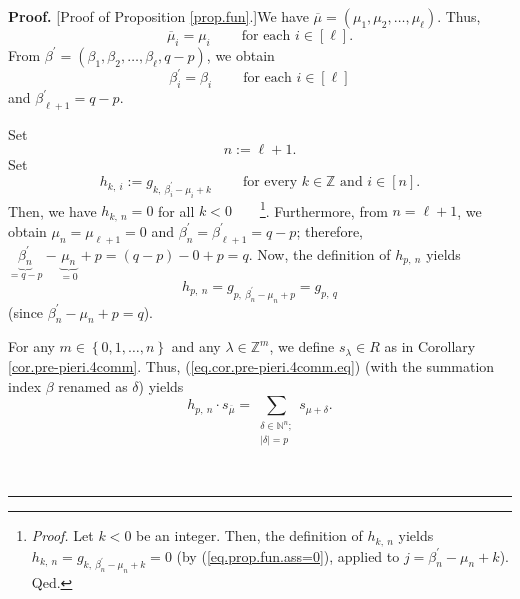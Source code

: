 \documentclass[numbers=enddot,12pt,final,onecolumn,notitlepage,english]{scrartcl}%
\theoremstyle{definition}
\newenvironment{proof}[1][Proof]{\noindent\textbf{#1.} }{\ \rule{0.5em}{0.5em}}
\let\sumnonlimits\sum
\renewcommand{\sum}{\sumnonlimits\limits}
\newenvironment{verlong}{}{}
\begin{document}
\begin{verlong}
\begin{proof}
[Proof of Proposition \ref{prop.fun}.]We have $\overline{\mu}=\left(  \mu
_{1},\mu_{2},\ldots,\mu_{\ell}\right)  $. Thus,%
\begin{equation}
\overline{\mu}_{i}=\mu_{i}\ \ \ \ \ \ \ \ \ \ \text{for each }i\in\left[
\ell\right]  . \label{pf.prop.fun.mubari}%
\end{equation}
From $\beta^{\prime}=\left(  \beta_{1},\beta_{2},\ldots,\beta_{\ell
},q-p\right)  $, we obtain%
\begin{equation}
\beta_{i}^{\prime}=\beta_{i}\ \ \ \ \ \ \ \ \ \ \text{for each }i\in\left[
\ell\right]  \label{pf.prop.fun.bprimei}%
\end{equation}
and $\beta_{\ell+1}^{\prime}=q-p$.

Set
\begin{equation}
n:=\ell+1. \label{pf.prop.fun.0}%
\end{equation}
Set%
\[
h_{k,\ i}:=g_{k,\ \beta_{i}^{\prime}-\mu_{i}+k}\ \ \ \ \ \ \ \ \ \ \text{for
every }k\in\mathbb{Z}\text{ and }i\in\left[  n\right]  .
\]
Then, we have $h_{k,\ n}=0$ for all $k<0$\ \ \ \ \footnote{\textit{Proof.} Let
$k<0$ be an integer. Then, the definition of $h_{k,\ n}$ yields $h_{k,\ n}%
=g_{k,\ \beta_{n}^{\prime}-\mu_{n}+k}=0$ (by (\ref{eq.prop.fun.ass=0}),
applied to $j=\beta_{n}^{\prime}-\mu_{n}+k$). Qed.}. Furthermore, from
$n=\ell+1$, we obtain $\mu_{n}=\mu_{\ell+1}=0$ and $\beta_{n}^{\prime}%
=\beta_{\ell+1}^{\prime}=q-p$; therefore, $\underbrace{\beta_{n}^{\prime}%
}_{=q-p}-\underbrace{\mu_{n}}_{=0}+p=\left(  q-p\right)  -0+p=q$. Now, the
definition of $h_{p,\ n}$ yields%
\begin{equation}
h_{p,\ n}=g_{p,\ \beta_{n}^{\prime}-\mu_{n}+p}=g_{p,\ q} \label{pf.prop.fun.1}%
\end{equation}
(since $\beta_{n}^{\prime}-\mu_{n}+p=q$).

For any $m\in\left\{  0,1,\ldots,n\right\}  $ and any $\lambda\in
\mathbb{Z}^{m}$, we define $s_{\lambda}\in R$ as in Corollary
\ref{cor.pre-pieri.4comm}. Thus, (\ref{eq.cor.pre-pieri.4comm.eq}) (with the
summation index $\beta$ renamed as $\delta$) yields%
\begin{equation}
h_{p,\ n}\cdot s_{\overline{\mu}}=\sum_{\substack{\delta\in\mathbb{N}%
^{n};\\\left\vert \delta\right\vert =p}}s_{\mu+\delta}.
\label{pf.prop.fun.cor}%
\end{equation}



\end{proof}
\end{verlong}
\end{document}
